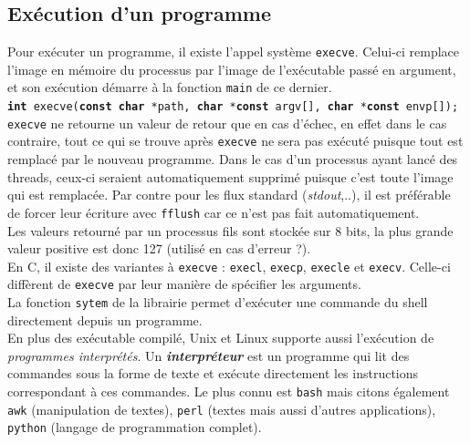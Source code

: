 \subsection{Exécution d'un programme}
Pour exécuter un programme, il existe l'appel système \texttt{execve}. Celui-ci remplace l'image en mémoire du processus par l'image de l'exécutable passé en argument, et son exécution démarre à la fonction \texttt{main} de ce dernier.\\
\texttt{\textbf{int} execve(\textbf{const} \textbf{char} *path, \textbf{char} *\textbf{const} argv[], \textbf{char} *\textbf{const} envp[]);}\\
\texttt{execve} ne retourne un valeur de retour que en cas d'échec, en effet dans le cas contraire, tout ce qui se trouve après \texttt{execve} ne sera pas exécuté puisque tout est remplacé par le nouveau programme. Dans le cas d'un processus ayant lancé des threads, ceux-ci seraient automatiquement supprimé puisque c'est toute l'image qui est remplacée. Par contre pour les flux standard (\textit{stdout},..), il est préférable de forcer leur écriture avec \texttt{fflush} car ce n'est pas fait automatiquement.\\

Les valeurs retourné par un processus fils sont stockée sur 8 bits, la plus grande valeur positive est donc 127 (utilisé en cas d'erreur ?). \\

En C, il existe des variantes à \texttt{execve} : \texttt{execl}, \texttt{execp}, \texttt{execle} et \texttt{execv}. Celle-ci diffèrent de \texttt{execve} par leur manière de spécifier les arguments. \\
La fonction \texttt{sytem} de la librairie permet d'exécuter une commande du shell directement depuis un programme.\\

En plus des exécutable compilé, Unix et Linux supporte aussi l'exécution de \textit{programmes interprétés}. %
Un \textit{\textbf{interpréteur}} est un programme qui lit des commandes sous la forme de texte et exécute directement les instructions correspondant à ces commandes. Le plus connu est \texttt{bash} mais citons également \texttt{awk} (manipulation de textes), \texttt{perl} (textes mais aussi d'autres applications), \texttt{python} (langage de programmation complet). \\

